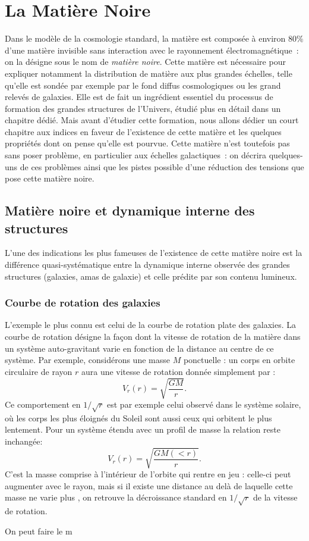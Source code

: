 \chapter{La Matière Noire}

Dans le modèle de la cosmologie standard, la matière est composée à environ $80\%$ d'une matière invisible sans interaction avec le rayonnement électromagnétique~: on la désigne sous le nom de \textit{matière noire}. Cette matière est nécessaire pour expliquer notamment la distribution de matière aux plus grandes échelles, telle qu'elle est sondée par exemple par le fond diffus cosmologiques ou les grand relevés de galaxies. Elle est de fait un ingrédient essentiel du processus de formation des grandes structures de l'Univers, étudié plus en détail dans un chapitre dédié. Mais avant d'étudier cette formation, nous allons dédier un court chapitre aux indices en faveur de l'existence de cette matière et les quelques propriétés dont on pense qu'elle est pourvue. Cette matière n'est toutefois pas sans poser problème, en particulier aux échelles galactiques~: on décrira quelques-uns de ces problèmes ainsi que les pistes possible d'une réduction des tensions que pose cette matière noire.

\section{Matière noire et dynamique interne des structures}
L'une des indications les plus fameuses de l'existence de cette matière noire est la différence quasi-systématique entre la dynamique interne observée des grandes structures (galaxies, amas de galaxie) et celle prédite par son contenu lumineux.

\subsection{Courbe de rotation des galaxies}
L'exemple le plus connu est celui de la courbe de rotation plate des galaxies. La courbe de rotation désigne  la façon dont la vitesse de rotation de la matière dans un système auto-gravitant varie en fonction de la distance au centre de ce système. Par exemple, considérons une masse $M$ ponctuelle : un corps en orbite circulaire de rayon $r$ aura une vitesse de rotation donnée simplement par :
\begin{equation}
V_r(r)=\sqrt{\frac{GM}{r}}.
\end{equation} 
Ce comportement en $1/\sqrt{r}$ est par exemple celui observé dans le système solaire, où les corps les plus éloignés du Soleil sont aussi ceux qui orbitent le plus lentement. Pour un système étendu avec un profil de masse la relation reste inchangée:
\begin{equation}
V_r(r)=\sqrt{\frac{GM(<r)}{r}}.
\end{equation}
C'est la masse comprise à l'intérieur de l'orbite qui rentre en jeu : celle-ci peut augmenter avec le rayon, mais si il existe une distance au delà de laquelle cette masse ne varie plus , on retrouve la décroissance standard en $1/\sqrt{r}$ de la vitesse de rotation.

On peut faire le m
